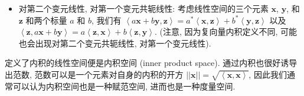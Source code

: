 \begin{itemize}
\item
  对第二个变元线性, 对第一个变元共轭线性: 考虑线性空间的三个元素
  \(\boldsymbol{x}\), \(\boldsymbol{y}\), 和 \(\boldsymbol{z}\)
  和两个标量 \(a\) 和 \(b\), 我们有
  \(\left<a\boldsymbol{x}+b\boldsymbol{y},\boldsymbol{z}\right>=a^*\left<\boldsymbol{x},\boldsymbol{z}\right>+b^*\left<\boldsymbol{y},\boldsymbol{z}\right>\)
  以及
  \(\left<\boldsymbol{z}, a\boldsymbol{x}+b\boldsymbol{y}\right>=a\left<\boldsymbol{z},\boldsymbol{x}\right>+b\left<\boldsymbol{z},\boldsymbol{y}\right>\).
  (注意, 因为复向量内积定义不同, 可能也会出现对第二个变元共轭线性,
  对第一个变元线性).
\end{itemize}

定义了内积的线性空间便是内积空间 (inner product space).
通过内积也很好诱导出范数, 范数可以是一个元素对自身的内积的开方
\(||\boldsymbol{x}||=\sqrt{\left<\boldsymbol{x},\boldsymbol{x}\right>}\),
因此我们通常可以认为内积空间也是一种赋范空间, 进而也是一种度量空间.

